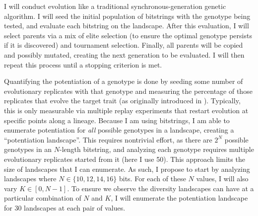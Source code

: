 
I will conduct evolution like a traditional synchronous-generation genetic algorithm. 
I will seed the initial population of bitstrings with the genotype being tested, and evaluate each bitstring on the landscape. 
After this evaluation, I will select parents via a mix of elite selection (to ensure the optimal genotype persists if it is discovered) and tournament selection. 
Finally, all parents will be copied and possibly mutated, creating the next generation to be evaluated. 
I will then repeat this process until a stopping criterion is met. 

Quantifying the potentiation of a genotype is done by seeding some number of evolutionary replicates with that genotype and measuring the percentage of those replicates that evolve the target trait (as originally introduced in \citet{blountHistoricalContingencyEvolution2008}). %
Typically, this is only measurable via multiple replay experiments that restart evolution at specific points along a lineage. 
Because I am using bitstrings, I am able to enumerate potentiation for \textit{all} possible genotypes in a landscape, creating a ``potentiation landscape''. 
This requires nontrivial effort, as there are $2^{N}$ possible genotypes in an $N$-length bitstring, and analyzing each genotype requires multiple evolutionary replicates started from it (here I use 50). 
This approach limits the size of landscapes that I can enumerate. 
As such, I propose to start by analyzing landscapes where $N \in \{10,12,14,16\}$ bits.
For each of these $N$ values, I will also vary $K \in [0, N - 1]$.
To ensure we observe the diversity landscapes can have at a particular combination of $N$ and $K$, I will enumerate the potentiation landscape for 30 landscapes at each pair of values. 


